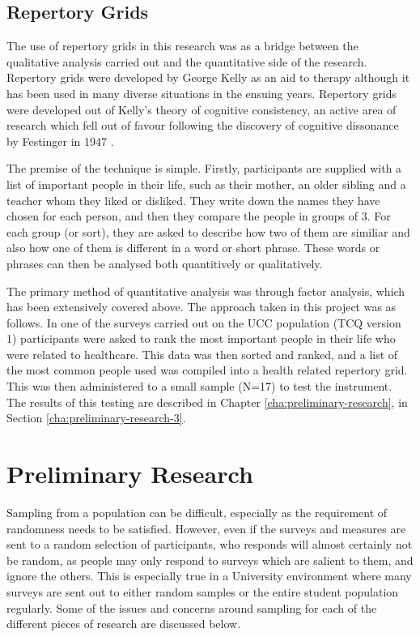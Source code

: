 \subsection{Repertory Grids}

The use of repertory grids in this research was as a bridge between the qualitative analysis carried out and the quantitative side of the research. Repertory grids were developed by George Kelly as an aid to therapy \cite{kelly2003psychology} although it has been used in many diverse situations in the ensuing years. Repertory grids were developed out of Kelly's theory of cognitive consistency, an active area of research which fell out of favour following the discovery of cognitive dissonance by Festinger in 1947 \cite{greenwald2002}.

The premise of the technique is simple. Firstly, participants are supplied with a list of important people in their life, such as their mother, an older sibling and a teacher whom they liked or disliked. They write down the names they have chosen for each person, and then they compare the people in groups of 3. For each group (or sort), they are asked to describe how two of them are similiar and also how one of them is different in a word or short phrase. These words or phrases can then be analysed both quantitively or qualitatively.

The primary method of quantitative analysis was through factor analysis, which has been extensively covered above. The approach taken in this project was as follows. In one of the surveys carried out on the UCC population (TCQ version 1) participants were asked to rank the most important people in their life who were related to healthcare. This data was then sorted and ranked, and a list of the most common people used was compiled into a health related repertory grid. This was then administered to a small sample (N=17) to test the instrument. The results of this testing are described in Chapter \ref{cha:preliminary-research}, in Section \ref{cha:preliminary-research-3}.

\section{Preliminary Research}

 Sampling from a population can be difficult, especially as the requirement of randomness needs to be satisfied. However, even if the surveys and measures are sent to a random selection of participants, who responds will almost certainly not be random, as people may only respond to surveys which are salient to them, and ignore the others. This is especially true in a University environment where many surveys are sent out to either random samples or the entire student population regularly. Some of the issues and concerns around sampling for each of the different pieces of research are discussed below.



